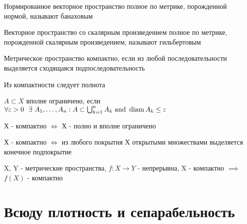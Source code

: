 \documentclass[a4paper,12pt]{article}
\begin{document}
\begin{definition*}[Банаховость]
Нормированное векторное пространство полное по метрике, порожденной нормой, называют банаховым
\end{definition*}

\begin{definition*}[Гильбертовость]
Векторное пространство со скалярным произведением полное по метрике, порожденной скалярным произведением, называют гильбертовым
\end{definition*}

\begin{definition*}[Компактность]
Метрическое пространство компактно, если из любой последовательности выделяется сходящаяся подпоследовательность
\end{definition*}

\begin{claim*}
Из компактности следует полнота
\end{claim*}

\begin{definition*}
$A \subset X$ вполне ограничено, если $\forall \varepsilon > 0 \ \ \exists \ A_1, \ldots, A_n : A \subset \bigcup_{k=1}^n A_k \ \text{and} \ \Diam{A_k} \le \varepsilon$
\end{definition*}

\begin{theorem*}
Х - компактно $\iff$ Х - полно и вполне ограничено
\end{theorem*}

\begin{theorem*}
Х - компактно $\iff$ из любого покрытия Х открытыми множествами выделяется конечное подпокрытие
\end{theorem*}

\begin{claim*}
X, Y - метрические пространства, $f : X \to Y$ - непрерывна, X - компактно $\implies$ $f(X)$ - компактно
\end{claim*}
















\vspace{2cm}

\section{Всюду плотность и сепарабельность}
\end{document}
